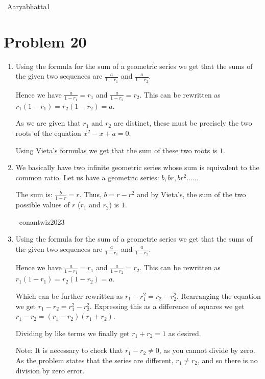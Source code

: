 \documentclass{article}%
\begin{document}
\begin{enumerate}
~Aaryabhatta1

%
\end{enumerate}

%
\section*{Problem 20}%
\label{sec:Problem20}%
\begin{enumerate}%
\item%
Using the formula for the sum of a geometric series we get that the sums of the given two sequences are $\frac a{1-r_1}$ and $\frac a{1-r_2}$. 

Hence we have $\frac a{1-r_1} = r_1$ and $\frac a{1-r_2} = r_2$.
This can be rewritten as $r_1(1-r_1) = r_2(1-r_2) = a$. 

As we are given that $r_1$ and $r_2$ are distinct, these must be precisely the two roots of the equation $x^2 - x + a = 0$.

Using \href{/wiki/index.php/Vieta%27s_formulas}{Vieta's formulas} we get that the sum of these two roots is $\boxed{1}$.



%
\item%
We basically have two infinite geometric series whose sum is equivalent to the common ratio. Let us have a geometric series: $b, br, br^2.....$. 

The sum is: $\frac{b}{1-r} = r.$ Thus, $b = r-r^2$ and by Vieta's, the sum of the two possible values of $r$ ($r_1$ and $r_2$) is $1$.



~conantwiz2023

%
\item%
Using the formula for the sum of a geometric series we get that the sums of the given two sequences are $\frac a{1-r_1}$ and $\frac a{1-r_2}$. 

Hence we have $\frac a{1-r_1} = r_1$ and $\frac a{1-r_2} = r_2$.
This can be rewritten as $r_1(1-r_1) = r_2(1-r_2) = a$.

Which can be further rewritten as $r_1-r_1^2 = r_2-r_2^2$.
Rearranging the equation we get $r_1-r_2 = r_1^2-r_2^2$.
Expressing this as a difference of squares we get $r_1-r_2 = (r_1-r_2)(r_1+r_2)$.

Dividing by like terms we finally get $r_1+r_2 = \boxed{1}$ as desired.




Note: It is necessary to check that $r_1-r_2\ne 0$, as you cannot divide by zero. As the problem states that the series are different, $r_1 \ne r_2$, and so there is no division by zero error.

%
\end{enumerate}
\end{document}
